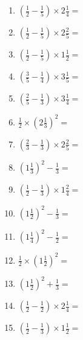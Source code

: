 \documentclass[12pt]{article}
\begin{document}
\begin{enumerate}
\item \large $ \left( \frac{1}{2} - \frac{1}{5} \right) \times 2 \frac{1}{4} = $ \vspace{1.6cm}
\item \large $ \left( \frac{1}{2} - \frac{1}{5} \right) \times 2 \frac{2}{5} = $ \vspace{1.6cm}
\item \large $ \left( \frac{1}{2} - \frac{1}{5} \right) \times 1 \frac{1}{2} = $ \vspace{1.6cm}
\item \large $ \left( \frac{3}{5} - \frac{1}{4} \right) \times 3 \frac{1}{5} = $ \vspace{1.6cm}
\item \large $ \left( \frac{2}{5} - \frac{1}{3} \right) \times 3 \frac{1}{4} = $ \vspace{1.6cm}
\item \large $ \frac{1}{2} \times \left( 2 \frac{1}{3} \right)^2 = $ \vspace{1.6cm}
\item \large $ \left( \frac{2}{3} - \frac{1}{3} \right) \times 2 \frac{2}{5} = $ \vspace{1.6cm}
\item \large $ \left( 1 \frac{1}{3} \right)^2 - \frac{1}{3} = $ \vspace{1.6cm}
\item \large $ \left( \frac{1}{2} - \frac{1}{3} \right) \times 1 \frac{2}{4} = $ \vspace{1.6cm}
\item \large $ \left( 1 \frac{1}{2} \right)^2 - \frac{1}{3} = $ \vspace{1.6cm}
\newpage
\item \large $ \left( 1 \frac{1}{4} \right)^2 - \frac{1}{2} = $ \vspace{1.6cm}
\item \large $ \frac{1}{2} \times \left( 1 \frac{1}{2} \right)^2 = $ \vspace{1.6cm}
\item \large $ \left( 1 \frac{1}{2} \right)^2 + \frac{1}{3} = $ \vspace{1.6cm}
\item \large $ \left( \frac{1}{2} - \frac{1}{2} \right) \times 2 \frac{1}{4} = $ \vspace{1.6cm}
\item \large $ \left( \frac{1}{2} - \frac{1}{3} \right) \times 1 \frac{1}{2} = $ \vspace{1.6cm}

\end{enumerate}
\end{document}

